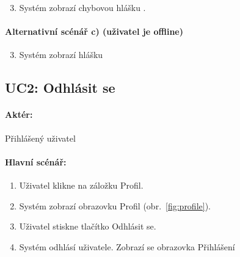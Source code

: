 \documentclass[twoside]{ctuthesis}
\begin{document}
	\begin{enumerate}[label=\arabic*b]
		\setcounter{enumi}{2}
		\item Systém zobrazí chybovou hlášku .
	\end{enumerate}

\paragraph{Alternativní scénář c) (uživatel je offline)}

	\begin{enumerate}[label=\arabic*c]
		\setcounter{enumi}{2}
		\item Systém zobrazí hlášku 
	\end{enumerate}
\newpage
\subsection{UC2: Odhlásit se}
\paragraph{Aktér:} Přihlášený uživatel
\paragraph{Hlavní scénář:}
\begin{enumerate}
	\item Uživatel klikne na záložku Profil.
	\item Systém zobrazí obrazovku Profil (obr.~\ref{fig:profile}).
	\item Uživatel stiskne tlačítko Odhlásit se.
	\item Systém odhlásí uživatele. Zobrazí se obrazovka Přihlášení
\end{enumerate}
\end{document}

